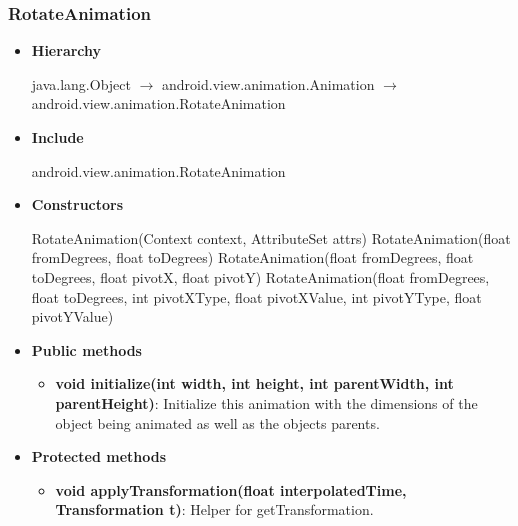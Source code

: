 \documentclass{report}
\begin{document}
    \subsubsection{RotateAnimation}
    \begin{itemize}
        \item \textbf{Hierarchy}
            \begin{center}
                java.lang.Object $\to$	android.view.animation.Animation $\to$	android.view.animation.RotateAnimation
            \end{center}
        \item \textbf{Include}
            \bigbreak \noindent 
            \begin{javacode}
                android.view.animation.RotateAnimation
            \end{javacode}
        \item \textbf{Constructors}
            \bigbreak \noindent 
            \begin{javacode}
                RotateAnimation(Context context, AttributeSet attrs)
                RotateAnimation(float fromDegrees, float toDegrees)
                RotateAnimation(float fromDegrees, float toDegrees, float pivotX, float pivotY)
                RotateAnimation(float fromDegrees, float toDegrees, int pivotXType, float pivotXValue, int pivotYType, float pivotYValue)
            \end{javacode}
        \item \textbf{Public methods}
            \begin{itemize}
                \item \textbf{void	initialize(int width, int height, int parentWidth, int parentHeight)}: Initialize this animation with the dimensions of the object being animated as well as the objects parents.
            \end{itemize}
        \item \textbf{Protected methods}
            \begin{itemize}
                \item \textbf{void	applyTransformation(float interpolatedTime, Transformation t)}: Helper for getTransformation.
            \end{itemize}

    \end{itemize}

    \pagebreak 
\end{document}
